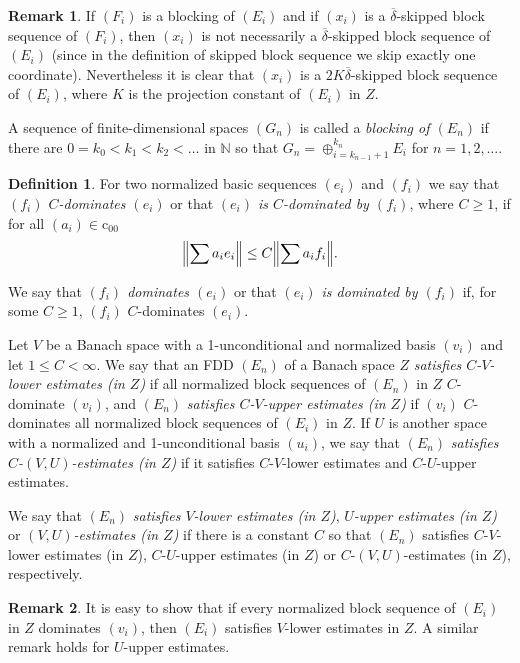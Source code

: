 \documentclass[11pt,leqno]{amsart}
\theoremstyle{definition}
\newtheorem*{defin}{Definition}
\newtheorem*{remark}{Remark}
\newcommand{\N}{\mathbb{N}}
\newcommand{\coo}{\mathrm{c}_{00}}
\newcommand{\deltab}{\overline\delta}
\begin{document}
\begin{remark}
  If $(F_i)$ is a blocking of $(E_i)$ and if $(x_i)$ is a
  $\deltab$-skipped block sequence of $(F_i)$, then $(x_i)$ is not
  necessarily a $\deltab$-skipped block sequence of $(E_i)$ (since  in
  the
  definition of skipped block sequence we skip exactly one
  coordinate). Nevertheless it is clear that $(x_i)$ is a
  $2K\deltab$-skipped block sequence of $(E_i)$, where $K$ is the
  projection constant of $(E_i)$ in $Z$.
\end{remark}
 

A sequence of finite-dimensional spaces $(G_n)$ is  called
  a {\em blocking of $(E_n)$} if
 there are
$0=k_0<k_1<k_2<\ldots$ in $\N$ so that
$G_n=\oplus_{i=k_{n-1}+1}^{k_n} E_i$ for $n=1,2,\ldots$.




\begin{defin}
  \label{D:1.1}
  For two normalized basic sequences $(e_i)$ and $(f_i)$ we say that
  {\em $(f_i)$ $C$-dominates  $(e_i)$} or that \emph{$(e_i)$   is
  $C$-dominated by $(f_i)$}, where   $C \ge 1$, if for all $(a_i)\in
  \coo$
  $$ \Bigl\|\sum a_ie_i\Bigr\|\le C  \Bigl\|\sum a_if_i\Bigr\|.$$
  
  We say that {\em $(f_i)$ dominates  $(e_i)$} or that \emph{$(e_i)$
  is dominated by $(f_i)$} if, for some $C\ge 1$,  $(f_i)$
  $C$-dominates  $(e_i)$.

  Let $V$ be a Banach space with a
  1-unconditional and normalized basis $(v_i)$ and let $1\le C<\infty$.
  We say that
  an FDD $(E_n)$ of a Banach space $Z$ {\em satisfies  $C$-$V$-lower
    estimates (in $Z$)}   if  all normalized
  block sequences of $(E_n)$ in $Z$   $C$-dominate   $(v_i)$,
  and   $(E_n)$  {\em satisfies  $C$-$V$-upper estimates (in
    $Z$)} if $(v_i)$ $C$-dominates all normalized block sequences of
  $(E_i)$ in $Z$.
  If  $U$ is another space with a normalized and 1-unconditional basis
  $(u_i)$, we say that $(E_n)$ {\em  satisfies  $C$-$(V,U)$-estimates
    (in $Z$)} if it   satisfies $C$-$V$-lower estimates and
  $C$-$U$-upper estimates.
  
  
  
  We say that $(E_n)$ {\em  satisfies $V$-lower estimates (in $Z$)},
  {\em  $U$-upper estimates (in $Z$)} or
  {\em $(V,U)$-estimates  (in $Z$)} if
  there is a constant $C$ so that $(E_n)$   satisfies $C$-$V$-lower estimates (in $Z$),
  $C$-$U$-upper estimates (in $Z$) or
  $C$-$(V,U)$-estimates  (in $Z$), respectively.
\end{defin}
\begin{remark}
  It is easy to show that if every normalized block sequence of
  $(E_i)$ in $Z$ dominates $(v_i)$, then $(E_i)$ satisfies
  $V$-lower estimates in $Z$. A similar remark holds for
  $U$-upper estimates.
\end{remark}
\end{document}
